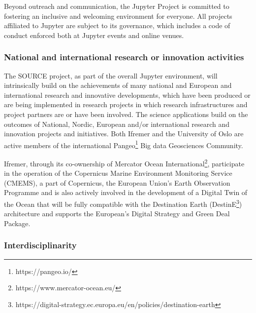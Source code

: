 Beyond outreach and communication, the Jupyter Project is committed to fostering an
inclusive and welcoming environment for everyone. All projects affiliated to
Jupyter are subject to its governance, which includes a code of conduct
enforced both at Jupyter events and online venues.

\subsubsection{National and international research or innovation activities}


The SOURCE project, as part of the overall Jupyter environment, will intrinsically build on the achievements of many
 national and European and international research and innovative developments, which have been produced or are
 being implemented in research projects in which research infrastructures and project partners are or have been
 involved.
The science applications build on the outcomes of National, Nordic, European and/or international research and
innovation projects and initiatives. Both Ifremer and the University of Oslo are active members of the international
Pangeo\footnote{https://pangeo.io/} Big data Geosciences Community.

Ifremer, through its co-ownership of Mercator Ocean International\footnote{https://www.mercator-ocean.eu/},
 participate in the operation of the Copernicus Marine Environment Monitoring Service (CMEMS),
 a part of Copernicus, the European Union’s Earth Observation Programme and is also actively involved in the
 development of a Digital Twin of the Ocean that will be fully compatible with the Destination Earth (DestinE\footnote{https://digital-strategy.ec.europa.eu/en/policies/destination-earth})
 architecture and supports the European's Digital Strategy and Green Deal Package.

\subsubsection{Interdisciplinarity}

